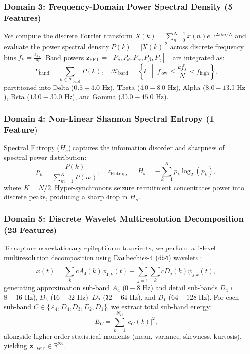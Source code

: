 \documentclass[pdflatex,sn-mathphys-num]{sn-jnl}
\begin{document}
\subsubsection{Domain 3: Frequency-Domain Power Spectral Density (5 Features)}
We compute the discrete Fourier transform $X(k) = \sum_{n=0}^{N-1} x(n) e^{-j 2\pi k n / N}$ and evaluate the power spectral density $P(k) = |X(k)|^2$ across discrete frequency bins $f_k = \frac{k f_s}{N}$. Band powers $\mathbf{z}_{\text{FFT}} = [P_\delta, P_\theta, P_\alpha, P_\beta, P_\gamma]^\top$ are integrated as:
\begin{equation}
P_{\text{band}} = \sum_{k \in \mathcal{K}_{\text{band}}} P(k), \quad \mathcal{K}_{\text{band}} = \left\{ k \;\middle|\; f_{\text{low}} \le \frac{k f_s}{N} < f_{\text{high}} \right\},
\label{eq:fft_bands}
\end{equation}
partitioned into Delta ($0.5-4.0\text{ Hz}$), Theta ($4.0-8.0\text{ Hz}$), Alpha ($8.0-13.0\text{ Hz}$), Beta ($13.0-30.0\text{ Hz}$), and Gamma ($30.0-45.0\text{ Hz}$).

\subsubsection{Domain 4: Non-Linear Shannon Spectral Entropy (1 Feature)}
Spectral Entropy ($H_s$) \cite{shannon1948mathematical,inouye1991potential} captures the information disorder and sharpness of spectral power distribution:
\begin{equation}
p_k = \frac{P(k)}{\sum_{m=1}^{K} P(m)}, \quad z_{\text{Entropy}} = H_s = -\sum_{k=1}^K p_k \log_2(p_k),
\label{eq:spectral_entropy}
\end{equation}
where $K = N/2$. Hyper-synchronous seizure recruitment concentrates power into discrete peaks, producing a sharp drop in $H_s$.

\subsubsection{Domain 5: Discrete Wavelet Multiresolution Decomposition (23 Features)}
To capture non-stationary epileptiform transients, we perform a 4-level multiresolution decomposition using Daubechies-4 (\texttt{db4}) wavelets \cite{daubechies1992ten,mallat1989theory,sharma2024time}:
\begin{equation}
x(t) = \sum_{k} c A_4(k) \phi_{4, k}(t) + \sum_{j=1}^4 \sum_{k} c D_j(k) \psi_{j, k}(t),
\label{eq:dwt_decomp}
\end{equation}
generating approximation sub-band $A_4$ ($0-8\text{ Hz}$) and detail sub-bands $D_4$ ($8-16\text{ Hz}$), $D_3$ ($16-32\text{ Hz}$), $D_2$ ($32-64\text{ Hz}$), and $D_1$ ($64-128\text{ Hz}$). For each sub-band $C \in \{A_4, D_4, D_3, D_2, D_1\}$, we extract total sub-band energy:
\begin{equation}
E_C = \sum_{k=1}^{N_C} |c_C(k)|^2,
\label{eq:dwt_energy}
\end{equation}
alongside higher-order statistical moments (mean, variance, skewness, kurtosis), yielding $\mathbf{z}_{\text{DWT}} \in \mathbb{R}^{23}$.
\end{document}
